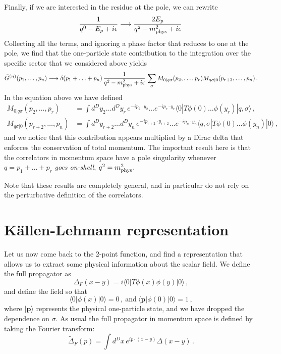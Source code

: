 Finally, if we are interested in the residue at the pole, we can rewrite
\begin{align}
  \frac{1}{q^0-E_p + i\epsilon} \longrightarrow \frac{2 E_p}{q^2-m_\mathrm{phys}^2 + i\epsilon}\, 
\end{align}
Collecting all the terms, and ignoring a phase factor that reduces to
one at the pole, we find that the one-particle state contribution to the
integration over the specific sector that we considered above yields
\begin{align}
  \tilde{G}^{(n)}(p_1,\ldots,p_n) \longrightarrow
  \delta(p_1+\ldots+p_n)\, \frac{1}{q^2-m_\mathrm{phys}^2+i\epsilon}\, 
  \sum_\sigma M_{0|q\sigma}(p_2,\ldots,p_r) M_{q\sigma|0}(p_{r+2},
  \ldots, p_n)\, .
\end{align}
In the equation above we have defined
\begin{align}
  M_{0|q\sigma}(p_2,\ldots,p_r) 
  &= \int d^Dy_2 \ldots d^Dy_r\, 
    e^{-ip_2\cdot y_2} \ldots e^{-ip_r\cdot y_r}
    \langle 0 |  T \phi(0) \ldots \phi(y_r) |
    q,\sigma\rangle \, , \\
 M_{q\sigma|0}(p_{r+2},\ldots, p_n) 
  &= \int d^Dy_{r+2} \ldots d^Dy_n\, 
    e^{-ip_{r+2}\cdot y_{r+2}} \ldots e^{-ip_n\cdot y_n}
    \langle q,\sigma |  T \phi(0) \ldots \phi(y_n) |
    0\rangle \, ,
\end{align}
and we notice that this contribution appears multiplied by a Dirac
delta that enforces the conservation of total momentum. The important
result here is that the correlators in momentum space have a pole
singularity whenever $q=p_1+\ldots+p_r$ {\em goes on-shell}, \ie
$q^2=m_\mathrm{phys}^2$.

Note that these results are completely general, and in particular do
not rely on the perturbative definition of the correlators. 

\section{K\"allen-Lehmann representation}
\label{sec:kall-lehm-repr}

Let us now come back to the 2-point function, and find a representation
that allows us to extract some physical information about the scalar
field. We define the full propagator as
\begin{equation}
  \label{eq:FullProp}
  \Delta_F(x-y) = i \langle 0| T \phi(x) \phi(y) |0\rangle \, ,
\end{equation}
and define the field so that
\begin{equation}
  \label{eq:FieldNorm}
  \langle 0 | \phi(x) | 0\rangle = 0\, ,\ \mathrm{and}\
  \langle \mathbf{p}| \phi(0) | 0\rangle = 1\, ,
\end{equation}
where $|\mathbf{p}\rangle$ represents the physical one-particle state,
and we have dropped the dependence on $\sigma$. As usual the full
propagator in momentum space is defined by taking the Fourier
transform:
\begin{equation}
  \label{eq:FullPropMom}
  \tilde{\Delta}_F(p) = 
  \int d^Dx\,  e^{ip\cdot(x-y)} \Delta(x-y)\, .
\end{equation}


